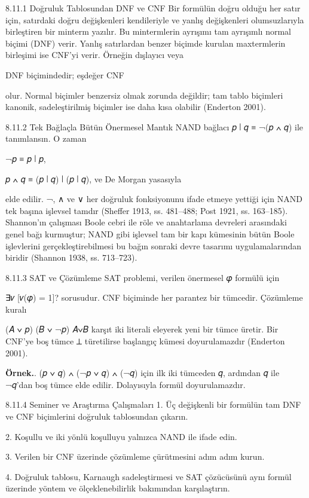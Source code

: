 8.11.1 Doğruluk Tablosundan DNF ve CNF Bir formülün doğru olduğu her satır için, satırdaki doğru değişkenleri kendileriyle ve yanlış değişkenleri olumsuzlarıyla birleştiren bir minterm yazılır. Bu mintermlerin ayrışımı tam ayrışımlı normal biçimi (DNF) verir. Yanlış satırlardan benzer biçimde kurulan maxtermlerin birleşimi ise CNF’yi verir. Örneğin dışlayıcı veya

DNF biçimindedir; eşdeğer CNF

olur. Normal biçimler benzersiz olmak zorunda değildir; tam tablo biçimleri kanonik, sadeleştirilmiş biçimler ise daha kısa olabilir (Enderton 2001).

8.11.2 Tek Bağlaçla Bütün Önermesel Mantık NAND bağlacı 𝑝 ∣ 𝑞 ≡ ¬(𝑝 ∧ 𝑞) ile tanımlansın. O zaman

¬𝑝 ≡ 𝑝 ∣ 𝑝,

𝑝 ∧ 𝑞 ≡ (𝑝 ∣ 𝑞) ∣ (𝑝 ∣ 𝑞), ve De Morgan yasasıyla

elde edilir. ¬, ∧ ve ∨ her doğruluk fonksiyonunu ifade etmeye yettiği için NAND tek başına işlevsel tamdır (Sheffer 1913, ss. 481–488; Post 1921, ss. 163–185). Shannon’ın çalışması Boole cebri ile röle ve anahtarlama devreleri arasındaki genel bağı kurmuştur; NAND gibi işlevsel tam bir kapı kümesinin bütün Boole işlevlerini gerçekleştirebilmesi bu bağın sonraki devre tasarımı uygulamalarından biridir (Shannon 1938, ss. 713–723).

8.11.3 SAT ve Çözümleme SAT problemi, verilen önermesel 𝜑 formülü için

∃𝑣 [𝑣(𝜑) = 1]? sorusudur. CNF biçiminde her parantez bir tümcedir. Çözümleme kuralı

(𝐴 ∨ 𝑝)  (𝐵 ∨ ¬𝑝) 𝐴∨𝐵 karşıt iki literali eleyerek yeni bir tümce üretir. Bir CNF’ye boş tümce ⊥ türetilirse başlangıç kümesi doyurulamazdır (Enderton 2001).

\begin{tcolorbox}[bookbox,colback=cEx]\textbf{\textsf{\textcolor{cAcc}{Örnek.}}}\quad. (𝑝 ∨ 𝑞) ∧ (¬𝑝 ∨ 𝑞) ∧ (¬𝑞) için ilk iki tümceden 𝑞, ardından 𝑞 ile ¬𝑞’dan boş tümce elde edilir. Dolayısıyla formül doyurulamazdır.\end{tcolorbox}

8.11.4 Seminer ve Araştırma Çalışmaları 1. Üç değişkenli bir formülün tam DNF ve CNF biçimlerini doğruluk tablosundan çıkarın.

2. Koşullu ve iki yönlü koşulluyu yalnızca NAND ile ifade edin.

3. Verilen bir CNF üzerinde çözümleme çürütmesini adım adım kurun.

4. Doğruluk tablosu, Karnaugh sadeleştirmesi ve SAT çözücüsünü aynı formül üzerinde yöntem ve ölçeklenebilirlik bakımından karşılaştırın.

